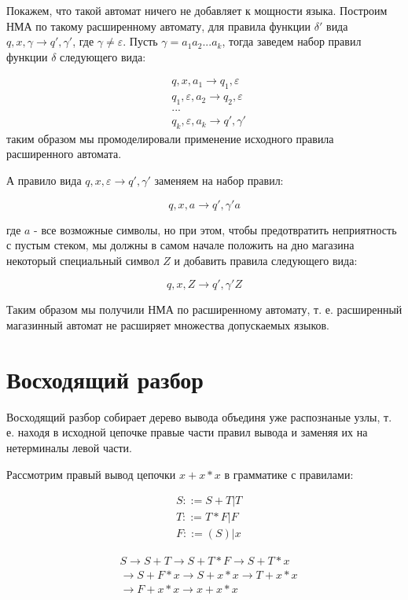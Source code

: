 Покажем, что такой автомат ничего не добавляет к мощности языка. Построим НМА по такому расширенному автомату,
для правила функции $\delta'$ вида $q,x,\gamma \rightarrow q',\gamma'$, где $\gamma \not= \varepsilon$. Пусть
$\gamma = a_1 a_2 ... a_k$, тогда заведем набор правил функции $\delta$ следующего вида:

\[
	\begin{split}
		& q, x, a_1 \rightarrow q_1, \varepsilon \\
		& q_1, \varepsilon, a_2 \rightarrow q_2, \varepsilon \\
		& ... \\
		& q_k, \varepsilon, a_k \rightarrow q', \gamma'
	\end{split}
\]
таким образом мы промоделировали применение исходного правила расширенного автомата.

А правило вида $q, x, \varepsilon \rightarrow q', \gamma'$ заменяем на набор правил:

$$ q, x, a \rightarrow q', \gamma'a $$

где $a$ - все возможные символы, но при этом, чтобы предотвратить неприятность с пустым стеком, мы должны в самом начале положить на дно магазина некоторый специальный символ $Z$ и добавить правила следующего вида:

$$ q, x, Z \rightarrow q', \gamma'Z $$

Таким образом мы получили НМА по расширенному автомату, т. е. расширенный магазинный автомат не расширяет множества
допускаемых языков.

\section{Восходящий разбор}

Восходящий разбор собирает дерево вывода объединя уже распознаные узлы, т. е. находя в исходной цепочке правые 
части правил вывода и заменяя их на нетерминалы левой части.

Рассмотрим правый вывод цепочки $x + x * x$ в грамматике с правилами:

\[
	\begin{split}
		& S ::= S + T | T \\
		& T ::= T * F | F \\
		& F ::= (S) | x
	\end{split}
\]

\[
	\begin{split}
		& S \rightarrow S + T \rightarrow S + T * F \rightarrow S + T * x \\
		& \rightarrow S + F * x \rightarrow S + x * x \rightarrow T + x * x \\
		& \rightarrow F + x * x \rightarrow x + x * x
	\end{split}
\]

